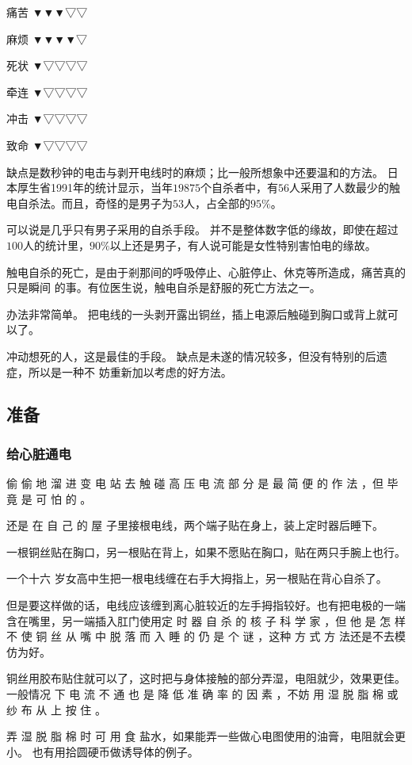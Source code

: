 \documentclass[UTF8]{ctexart}
\begin{document}
痛苦 ▼▼▼▽▽

麻烦 ▼▼▼▼▽

死状 ▼▽▽▽▽

牵连 ▼▽▽▽▽

冲击 ▼▽▽▽▽

致命 ▼▽▽▽▽

缺点是数秒钟的电击与剥开电线时的麻烦；比一般所想象中还要温和的方法。
日本厚生省1991年的统计显示，当年$19875$个自杀者中，有$56$人采用了人数最少的触电自杀法。而且，奇怪的是男子为$53$人，占全部的$95\%$。

可以说是几乎只有男子采用的自杀手段。
并不是整体数字低的缘故，即使在超过$100$人的统计里，$90\%$以上还是男子，有人说可能是女性特别害怕电的缘故。

触电自杀的死亡，是由于剎那间的呼吸停止、心脏停止、休克等所造成，痛苦真的只是瞬间 的事。有位医生说，触电自杀是舒服的死亡方法之一。

办法非常简单。
把电线的一头剥开露出铜丝，插上电源后触碰到胸口或背上就可以了。

冲动想死的人，这是最佳的手段。
缺点是未遂的情况较多，但没有特别的后遗症，所以是一种不 妨重新加以考虑的好方法。

\subsection{准备}

\subsubsection*{给心脏通电}

偷 偷 地 溜 进 变 电 站 去 触 碰 高 压 电 流 部 分 是 最 简 便 的 作 法 ，但 毕 竟 是 可 怕 的 。

还是 在 自 己 的 屋 子里接根电线，两个端子贴在身上，装上定时器后睡下。 

一根铜丝贴在胸口，另一根贴在背上，如果不愿贴在胸口，贴在两只手腕上也行。

一个十六 岁女高中生把一根电线缠在右手大拇指上，另一根贴在背心自杀了。

但是要这样做的话，电线应该缠到离心脏较近的左手拇指较好。也有把电极的一端含在嘴里，另一端插入肛门使用定 时 器 自 杀 的 核 子 科 学 家 ，但 他 是 怎 样 不 使 铜 丝 从 嘴 中 脱 落 而 入 睡 的 仍 是 个 谜 ，这种 方 式 方 法还是不去模仿为好。

铜丝用胶布贴住就可以了，这时把与身体接触的部分弄湿，电阻就少，效果更佳。一般情况 下 电 流 不 通 也 是 降 低 准 确 率 的 因 素 ，不妨 用 湿 脱 脂 棉 或 纱 布 从 上 按 住 。

弄 湿 脱 脂 棉 时 可 用 食 盐水，如果能弄一些做心电图使用的油膏，电阻就会更小。
也有用拾圆硬币做诱导体的例子。
\end{document}
